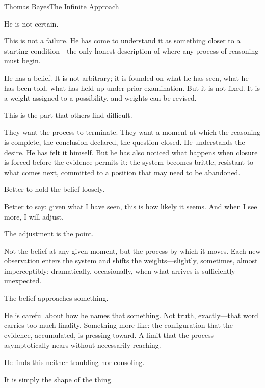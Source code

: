 
\begin{formalecho}{Thomas Bayes}{The Infinite Approach}

He is not certain.

This is not a failure. He has come to understand it as something
closer to a starting condition---the only honest description of
where any process of reasoning must begin.

He has a belief. It is not arbitrary; it is founded on what he has
seen, what he has been told, what has held up under prior
examination. But it is not fixed. It is a weight assigned to a
possibility, and weights can be revised.

This is the part that others find difficult.

They want the process to terminate. They want a moment at which
the reasoning is complete, the conclusion declared, the question
closed. He understands the desire. He has felt it himself. But he
has also noticed what happens when closure is forced before the
evidence permits it: the system becomes brittle, resistant to what
comes next, committed to a position that may need to be abandoned.

Better to hold the belief loosely.

Better to say: given what I have seen, this is how likely it seems.
And when I see more, I will adjust.

\medskip

The adjustment is the point.

Not the belief at any given moment, but the process by which it
moves. Each new observation enters the system and shifts the
weights---slightly, sometimes, almost imperceptibly; dramatically,
occasionally, when what arrives is sufficiently unexpected.

The belief approaches something.

He is careful about how he names that something. Not truth,
exactly---that word carries too much finality. Something more like:
the configuration that the evidence, accumulated, is pressing
toward. A limit that the process asymptotically nears without
necessarily reaching.

He finds this neither troubling nor consoling.

It is simply the shape of the thing.


\end{formalecho}
